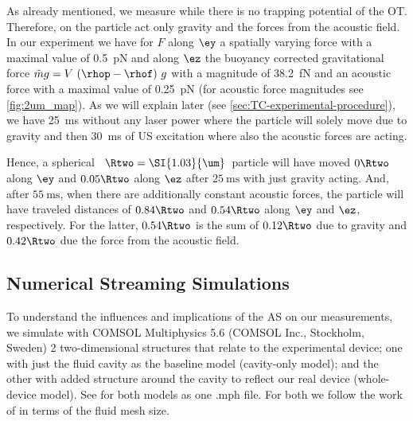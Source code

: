 As already mentioned, we measure while there is no trapping potential of the 
OT. Therefore, on the particle act only gravity and the forces from the 
acoustic field. In our experiment we have for $F$ along $\ey$ a spatially 
varying force with a maximal value of \SI{0.5}{\pico\newton} and along $\ez$ 
the buoyancy corrected gravitational force $\tilde{m}g=V\,\left( \rhop-\rhof 
\right)\,g$ with a magnitude of \SI{38.2}{\femto\newton} and an acoustic force 
with a maximal value of \SI{0.25}{\pico\newton} (for acoustic force magnitudes 
see \cref{fig:2um_map}). As we will explain later (see 
\cref{sec:TC-experimental-procedure}), we have \SI{25}{\ms} without any laser 
power where the particle will solely move due to gravity and then \SI{30}{\ms} 
of US excitation where also the acoustic forces are acting.

Hence, a spherical \SiO~$\Rtwo=\SI{1.03}{\um}$~particle will have moved 
$0\Rtwo$ along $\ey$ and $0.05\Rtwo$ along $\ez$ after $\SI{25}{\ms}$ with just 
gravity acting. And, after $\SI{55}{\ms}$, when there are additionally 
constant acoustic forces, the particle will have traveled distances of 
$0.84\Rtwo$ and $0.54\Rtwo$ along $\ey$ and $\ez$, respectively. For the 
latter, $0.54\Rtwo$ is the sum of $0.12\Rtwo$ due to gravity and $0.42\Rtwo$ 
due the force from the acoustic field.

\subsection{Numerical Streaming Simulations}

To understand the influences and implications of the AS on our measurements, we 
simulate with {\ttfamily COMSOL Multiphysics 5.6} (COMSOL Inc., Stockholm, 
Sweden) 2 two-dimensional structures that relate to the experimental device; 
one with just the fluid cavity as the baseline model (cavity-only model); and 
the other with added structure around the cavity to reflect our real device 
(whole-device model). See \cite{supplemental} for both models as one {\ttfamily 
.mph} file. For both we follow the work of \citeauthor{Muller2015} 
\cite{Muller2015} in terms of the fluid mesh size.

